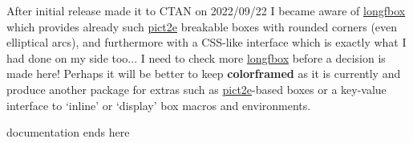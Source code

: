 \documentclass[a4paper,dvipdfmx,11pt,english]{article}
\def\ctanpackage#1{\href{https://ctan.org/pkg/#1}{#1}}
\newcommand\colorframed{%
        \texorpdfstring{{\color{joli}\bfseries colorframed}}{colorframed}\xspace}
\begin{document}

\thispagestyle{empty}
\enlargethispage{2\baselineskip}

\footnotesize
\begin{snugshade}
  After initial release made it to CTAN on
  2022/09/22 I became aware of \ctanpackage{longfbox} which
  provides already such \ctanpackage{pict2e} breakable boxes with
  rounded corners (even elliptical arcs), and furthermore with a
  CSS-like interface which is exactly what I had done on my side
  too... I need to check more \ctanpackage{longfbox} before a
  decision is made here!  Perhaps it will be better to keep
  \colorframed as it is currently and produce another package for
  extras such as \ctanpackage{pict2e}-based boxes or a key-value
  interface to `inline' or `display' box macros and environments.
\end{snugshade}
\centerline{\hrulefill documentation ends here\hrulefill}
\end{document}
